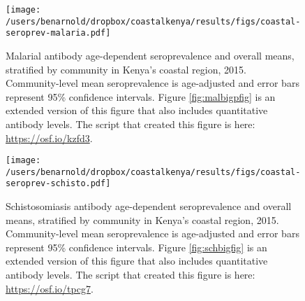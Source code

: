 \documentclass[11pt]{article}
\begin{document}
\begin{figure}[htbp]
\begin{center}
\texttt{[image: /users/benarnold/dropbox/coastalkenya/results/figs/coastal-seroprev-malaria.pdf]} 
\begin{minipage}{0.9\textwidth}
\caption{Malarial antibody age-dependent seroprevalence and overall means, stratified by community in Kenya's coastal region, 2015. Community-level mean seroprevalence is age-adjusted and error bars represent 95\% confidence intervals. Figure \ref{fig:malbigpfig} is an extended version of this figure that also includes quantitative antibody levels. The script that created this figure is here: \url{https://osf.io/kzfd3}.}
\label{fig:malariaseroprev}
\end{minipage}
\end{center}
\end{figure}


\begin{figure}[htbp]
\begin{center}
\texttt{[image: /users/benarnold/dropbox/coastalkenya/results/figs/coastal-seroprev-schisto.pdf]} 
\begin{minipage}{0.9\textwidth}
\caption{Schistosomiasis antibody age-dependent seroprevalence and overall means, stratified by community in Kenya's coastal region, 2015. Community-level mean seroprevalence is age-adjusted and error bars represent 95\% confidence intervals. Figure \ref{fig:schbigfig} is an extended version of this figure that also includes quantitative antibody levels. The script that created this figure is here: \url{https://osf.io/tpcg7}. }
\label{fig:schistoseroprev}
\end{minipage}
\end{center}
\end{figure}
\end{document}
